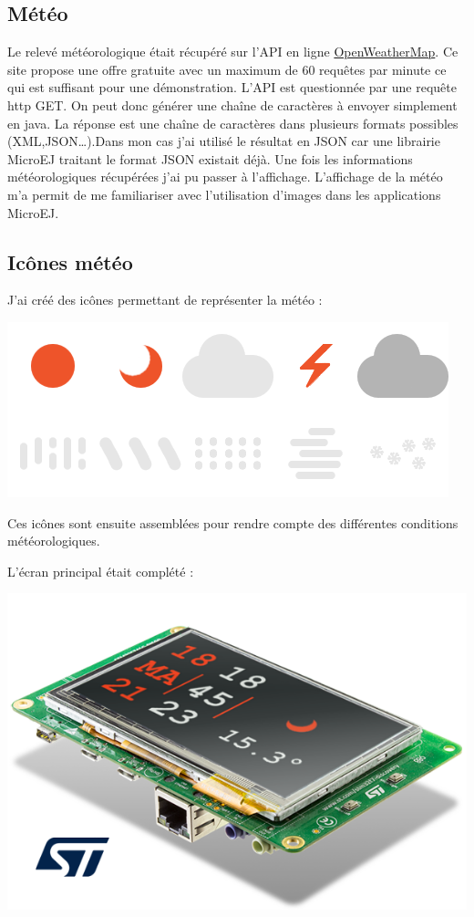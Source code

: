\documentclass[french,a4paper,12pt]{report}
\begin{document}
\subsection{Météo}

Le relevé météorologique était récupéré sur l’API en ligne \href{https://openweathermap.org/}{OpenWeatherMap}. Ce site propose une offre gratuite avec un maximum de 60 requêtes par minute ce qui est suffisant pour une démonstration. L’API est questionnée par une requête http GET. On peut donc générer une chaîne de caractères à envoyer simplement en java. La réponse est une chaîne de caractères dans plusieurs formats possibles (XML,JSON…).Dans mon cas j’ai utilisé le résultat en JSON car une librairie MicroEJ traitant le format JSON existait déjà. 
Une fois les informations météorologiques récupérées j’ai pu passer à l’affichage. L’affichage de la météo m’a permit de me familiariser avec l’utilisation d’images dans les applications MicroEJ. 

\subsection{Icônes météo}

J'ai créé des icônes permettant de représenter la météo :

\begin{center}
\includegraphics[width=.5\textwidth]{./ressources/images/weathertogether.png}
\end{center}

Ces icônes sont ensuite assemblées pour rendre compte des différentes conditions météorologiques.

L'écran principal était complété :

\begin{center}
\includegraphics[width=.5\textwidth]{./ressources/schemas/inSituation.png}
\end{center}
\end{document}
